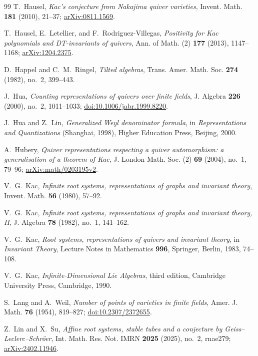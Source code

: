 \documentclass[11pt, reqno]{amsart}
\numberwithin{equation}{section}
\theoremstyle{definition}
\theoremstyle{remark}
\begin{document}
\begin{thebibliography}{99}
T.~Hausel,
\emph{Kac's conjecture from Nakajima quiver varieties},
Invent. Math. \textbf{181} (2010), 21--37;
\href{https://arxiv.org/abs/0811.1569}{arXiv:0811.1569}.

T.~Hausel, E.~Letellier, and F.~Rodriguez-Villegas,
\emph{Positivity for Kac polynomials and DT-invariants of quivers},
Ann. of Math. (2) \textbf{177} (2013), 1147--1168;
\href{https://arxiv.org/abs/1204.2375}{arXiv:1204.2375}.

D.~Happel and C.~M.~Ringel,
\emph{Tilted algebras}, Trans. Amer. Math. Soc. \textbf{274} (1982),
no.~2, 399--443.

J.~Hua,
\emph{Counting representations of quivers over finite fields},
J. Algebra \textbf{226} (2000), no.~2, 1011--1033;
\href{https://doi.org/10.1006/jabr.1999.8220}{doi:10.1006/jabr.1999.8220}.

J.~Hua and Z.~Lin,
\emph{Generalized Weyl denominator formula}, in
\emph{Representations and Quantizations} (Shanghai, 1998),
Higher Education Press, Beijing, 2000.

A.~Hubery,
\emph{Quiver representations respecting a quiver automorphism:
a generalisation of a theorem of Kac},
J. London Math. Soc. (2) \textbf{69} (2004), no.~1, 79--96;
\href{https://arxiv.org/abs/math/0203195v2}{arXiv:math/0203195v2}.

V.~G.~Kac,
\emph{Infinite root systems, representations of graphs and invariant
theory}, Invent. Math. \textbf{56} (1980), 57--92.

V.~G.~Kac,
\emph{Infinite root systems, representations of graphs and invariant
theory, II}, J. Algebra \textbf{78} (1982), no.~1, 141--162.


V.~G.~Kac,
\emph{Root systems, representations of quivers and invariant theory},
in \emph{Invariant Theory}, Lecture Notes in Mathematics
\textbf{996}, Springer, Berlin, 1983, 74--108.

V.~G.~Kac,
\emph{Infinite-Dimensional Lie Algebras}, third edition,
Cambridge University Press, Cambridge, 1990.

S.~Lang and A.~Weil,
\emph{Number of points of varieties in finite fields},
Amer. J. Math. \textbf{76} (1954), 819--827;
\href{https://doi.org/10.2307/2372655}{doi:10.2307/2372655}.

Z.~Lin and X.~Su,
\emph{Affine root systems, stable tubes and a conjecture by
Geiss--Leclerc--Schr\"oer},
Int. Math. Res. Not. IMRN \textbf{2025} (2025), no.~2, rnae279;
\href{https://arxiv.org/abs/2402.11946}{arXiv:2402.11946}.


\end{thebibliography}
\end{document}
